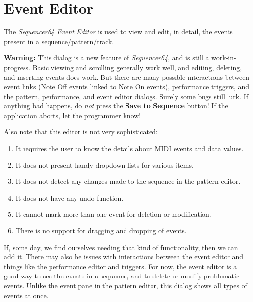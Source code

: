 %
%

\section{Event Editor}
\label{sec:seq64_event_editor}

   The \textsl{Sequencer64 Event Editor} is used to view and edit,
   in detail, the events present in a sequence/pattern/track.

   \textbf{Warning:}
   This dialog is a new feature of \textsl{Sequencer64}, and is
   still a work-in-progress.  Basic viewing and scrolling generally work well,
   and editing, deleting, and inserting events does work.
   But there are many possible interactions between event links (Note Off
   events linked to Note On events), performance triggers, and the pattern,
   performance, and event editor dialogs.
   Surely some bugs still lurk.
   If anything bad happens, do \textsl{not} press the
   \textbf{Save to Sequence} button!
   If the application aborts, let the programmer know!

   Also note that this editor is not very sophisticated:

   \begin{enumerate}
      \item It requires the user to know the details
         about MIDI events and data values.
      \item It does not present handy dropdown lists for various items.
      \item It does not detect any changes made to the sequence in the
         pattern editor.
      \item It does not have any undo function.
      \item It cannot mark more than one event for deletion or modification.
      \item There is no support for dragging and dropping of events.
   \end{enumerate}

   If, some day, we find ourselves needing
   that kind of functionality, then we can add it.
   There may also be issues with interactions between the event editor and
   things like the performance editor and triggers.
   For now, the event editor is a good way to see the events in a sequence,
   and to delete or modify problematic events.
   Unlike the event pane in the pattern editor, this dialog shows all types of
   events at once.

